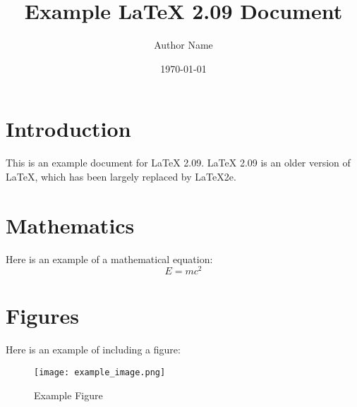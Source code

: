 
\title{Example LaTeX 2.09 Document}
\author{Author Name}
\date{\today}



\maketitle

\section{Introduction}
This is an example document for LaTeX 2.09. LaTeX 2.09 is an older version of LaTeX, which has been largely replaced by LaTeX2e.

\section{Mathematics}
Here is an example of a mathematical equation:
\begin{equation}
E = mc^2
\end{equation}

\section{Figures}
Here is an example of including a figure:
\begin{figure}[h]
\centering
\texttt{[image: example\_image.png]}
\caption{Example Figure}
\end{figure}


